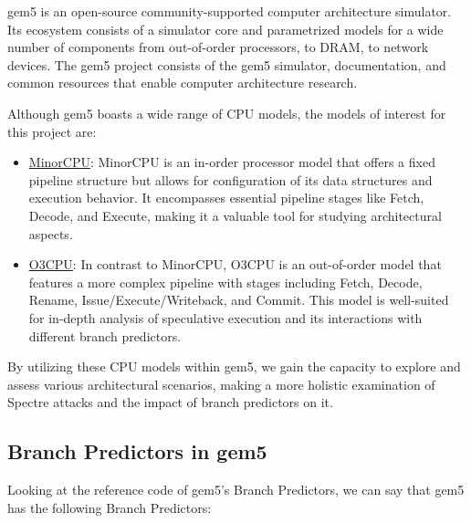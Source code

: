 \documentclass[twocolumn,showpacs,%
  nofootinbib,aps,superscriptaddress,%
  eqsecnum,prd,notitlepage,showkeys,10pt]{revtex4-1}
\begin{document}
gem5 is an open-source community-supported computer architecture simulator. Its ecosystem consists of a simulator core and parametrized models for a wide number of components from out-of-order processors, to DRAM, to network devices. The gem5 project consists of the gem5 simulator, documentation, and common resources that enable computer architecture research. \cite{lowepower2020gem5}


Although gem5 boasts a wide range of CPU models, the models of interest for this project are:

\begin{itemize}
    \item \underline{MinorCPU}: MinorCPU is an in-order processor model that offers a fixed pipeline structure but allows for configuration of its data structures and execution behavior. It encompasses essential pipeline stages like Fetch, Decode, and Execute, making it a valuable tool for studying architectural aspects.\cite{butko2015design}
    \item \underline{O3CPU}: In contrast to MinorCPU, O3CPU is an out-of-order model that features a more complex pipeline with stages including Fetch, Decode, Rename, Issue/Execute/Writeback, and Commit. This model is well-suited for in-depth analysis of speculative execution and its interactions with different branch predictors.\cite{butko2015design}
\end{itemize}

By utilizing these CPU models within gem5, we gain the capacity to explore and assess various architectural scenarios, making a more holistic examination of Spectre attacks and the impact of branch predictors on it.

\subsection{Branch Predictors in gem5}

Looking at the reference code of gem5's Branch Predictors, we can say that gem5 has the following Branch Predictors\cite{Branch}:
\end{document}
